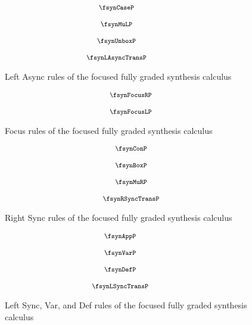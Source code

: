 \begin{figure}[H]
  \begin{align*}
  {\footnotesize{
\hspace{-4em}\begin{array}{c}
      \fsynCaseP
      \\[1.25em]
      \fsynMuLP
      \\[1.25em]
      \fsynUnboxP
      \\[1.25em]
      \fsynLAsyncTransP
  \end{array}
  }}
  \end{align*}
  \caption{Left Async rules of the focused fully graded synthesis calculus}
  \label{fig:focus-graded-left-async}
\end{figure}

\begin{figure}[H]
  \begin{align*}
    {\footnotesize{
\begin{array}{c}
      \fsynFocusRP
      \\[1.25em]
      \fsynFocusLP
  \end{array}
    }}
  \end{align*}
  \caption{Focus rules of the focused fully graded synthesis calculus}
  \label{fig:focus-graded-focus}
\end{figure}

\begin{figure}[H]
  \begin{align*}
    {\footnotesize{
\begin{array}{c}
      \fsynConP
      \\[1.25em]
      \fsynBoxP
      \\[1.25em]
      \fsynMuRP
      \\[1.25em]
      \fsynRSyncTransP
  \end{array}
    }}
  \end{align*}
  \caption{Right Sync rules of the focused fully graded synthesis calculus}
  \label{fig:focus-graded-right-sync}
\end{figure}


\begin{figure}[H]
  \begin{align*}
    {\footnotesize{
\hspace{-3em}\begin{array}{c}
      \fsynAppP
      \\[1.25em]
      \fsynVarP
      \\[1.25em]
      \fsynDefP
      \\[1.25em]
      \fsynLSyncTransP
  \end{array}
    }}
  \end{align*}
  \caption{Left Sync, Var, and Def rules of the focused fully graded synthesis calculus}
  \label{fig:focus-graded-left-sync}
\end{figure}


